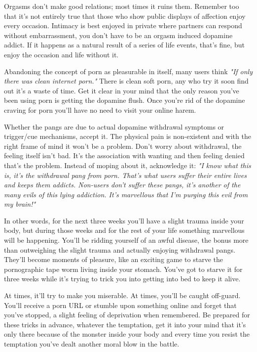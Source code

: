 \documentclass[easypeasy.tex]{subfiles}
\begin{document}
Orgasms don't make good relations; most times it ruins them. Remember too that it's not entirely true that those who show public displays of affection enjoy every occasion. Intimacy is best enjoyed in private where partners can respond without embarrassment, you don't have to be an orgasm induced dopamine addict. If it happens as a natural result of a series of life events, that's fine, but enjoy the occasion and life without it.

Abandoning the concept of porn as pleasurable in itself, many users think \textit{"If only there was clean internet porn."} There is clean soft porn, any who try it soon find out it's a waste of time. Get it clear in your mind that the only reason you've been using porn is getting the dopamine flush. Once you're rid of the dopamine craving for porn you'll have no need to visit your online harem.

Whether the pangs are due to actual dopamine withdrawal symptoms or trigger/cue mechanisms, accept it. The physical pain is non-existent and with the right frame of mind it won't be a problem. Don't worry about withdrawal, the feeling itself isn't bad. It's the association with wanting and then feeling denied that's the problem. Instead of moping about it, acknowledge it: \textit{"I know what this is, it's the withdrawal pang from porn. That's what users suffer their entire lives and keeps them addicts. Non-users don't suffer these pangs, it's another of the many evils of this lying addiction. It's marvellous that I'm purging this evil from my brain!"}

In other words, for the next three weeks you'll have a slight trauma inside your body, but during those weeks and for the rest of your life something marvellous will be happening. You'll be ridding yourself of an awful disease, the bonus more than outweighing the slight trauma and actually enjoying withdrawal pangs. They'll become moments of pleasure, like an exciting game to starve the pornographic tape worm living inside your stomach. You've got to starve it for three weeks while it's trying to trick you into getting into bed to keep it alive.

At times, it'll try to make you miserable. At times, you'll be caught off-guard. You'll receive a porn URL or stumble upon something online and forget that you've stopped, a slight feeling of deprivation when remembered. Be prepared for these tricks in advance, whatever the temptation, get it into your mind that it's only there because of the monster inside your body and every time you resist the temptation you've dealt another moral blow in the battle.
\end{document}
